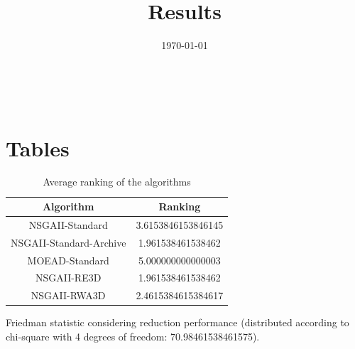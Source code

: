\documentclass{article}
\title{Results}
\author{}
\date{\today}
\begin{document}
\oddsidemargin 0in \topmargin 0in\maketitle
\
\section{Tables}
\begin{table}[!htp]
\centering
\caption{Average ranking of the algorithms}
\begin{tabular}{c|c}
Algorithm&Ranking\\
\hline
NSGAII-Standard&3.6153846153846145\\
NSGAII-Standard-Archive&1.961538461538462\\
MOEAD-Standard&5.000000000000003\\
NSGAII-RE3D&1.961538461538462\\
NSGAII-RWA3D&2.4615384615384617\\
\end{tabular}
\end{table}


Friedman statistic considering reduction performance (distributed according to chi-square with 4 degrees of freedom: 70.98461538461575).
\end{document}
